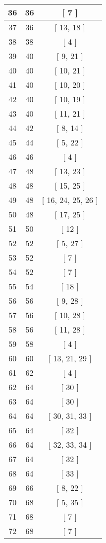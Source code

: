\begin{center}
\begin{longtable}[H]{|| c c c ||}
36 & 36 & [ 7 ] \\ 
\hline
37 & 36 & [ 13, 18 ] \\ 
\hline
38 & 38 & [ 4 ] \\ 
\hline
39 & 40 & [ 9, 21 ] \\ 
\hline
40 & 40 & [ 10, 21 ] \\ 
\hline
41 & 40 & [ 10, 20 ] \\ 
\hline
42 & 40 & [ 10, 19 ] \\ 
\hline
43 & 40 & [ 11, 21 ] \\ 
\hline
44 & 42 & [ 8, 14 ] \\ 
\hline
45 & 44 & [ 5, 22 ] \\ 
\hline
46 & 46 & [ 4 ] \\ 
\hline
47 & 48 & [ 13, 23 ] \\ 
\hline
48 & 48 & [ 15, 25 ] \\ 
\hline
49 & 48 & [ 16, 24, 25, 26 ] \\ 
\hline
50 & 48 & [ 17, 25 ] \\ 
\hline
51 & 50 & [ 12 ] \\ 
\hline
52 & 52 & [ 5, 27 ] \\ 
\hline
53 & 52 & [ 7 ] \\ 
\hline
54 & 52 & [ 7 ] \\ 
\hline
55 & 54 & [ 18 ] \\ 
\hline
56 & 56 & [ 9, 28 ] \\ 
\hline
57 & 56 & [ 10, 28 ] \\ 
\hline
58 & 56 & [ 11, 28 ] \\ 
\hline
59 & 58 & [ 4 ] \\ 
\hline
60 & 60 & [ 13, 21, 29 ] \\ 
\hline
61 & 62 & [ 4 ] \\ 
\hline
62 & 64 & [ 30 ] \\ 
\hline
63 & 64 & [ 30 ] \\ 
\hline
64 & 64 & [ 30, 31, 33 ] \\ 
\hline
65 & 64 & [ 32 ] \\ 
\hline
66 & 64 & [ 32, 33, 34 ] \\ 
\hline
67 & 64 & [ 32 ] \\ 
\hline
68 & 64 & [ 33 ] \\ 
\hline
69 & 66 & [ 8, 22 ] \\ 
\hline
70 & 68 & [ 5, 35 ] \\ 
\hline
71 & 68 & [ 7 ] \\ 
\hline
72 & 68 & [ 7 ] \\ 
\hline

\end{longtable}
\end{center}
